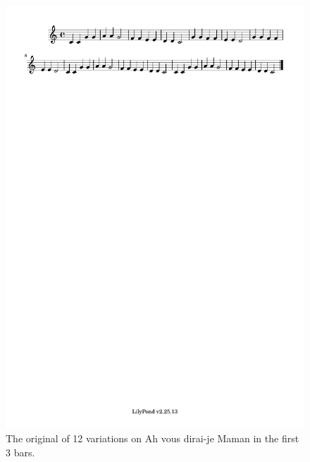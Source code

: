 \documentclass[11pt]{article}
\begin{document}
\begin{figure}
\centering
\includegraphics[trim=1cm 26.5cm 10.055cm 0.02cm, clip, scale=1]{dabby_1.pdf} %
\caption{The original of 12 variations on Ah vous dirai-je Maman in the first 3 bars.}
\label{fig:Dabby1} 
\end{figure}
\end{document}
